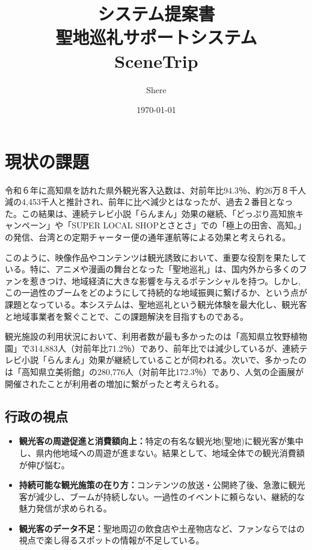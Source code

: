 \documentclass[a4j, 11pt, report]{jsarticle}
\title{
    {\Huge システム提案書} \\
    \vspace{6cm}
    {\Huge 聖地巡礼サポートシステム} \\
    \vspace{0.5cm}
    {\Huge \textbf{SceneTrip}}
}
\author{Shere}
\date{\today}
\begin{document}
\maketitle
\thispagestyle{empty}
\clearpage

\tableofcontents
\clearpage

\section{現状の課題}
令和６年に高知県を訪れた県外観光客入込数は、対前年比94.3％、約26万８千人減の4,453千人と推計され、前年に比べ減少とはなったが、過去２番目となった。この結果は、連続テレビ小説「らんまん」効果の継続、「どっぷり高知旅キャンペーン」や「SUPER LOCAL SHOPとさとさ」での「極上の田舎、高知。」の発信、台湾との定期チャーター便の通年運航等による効果と考えられる。

このように、映像作品やコンテンツは観光誘致において、重要な役割を果たしている。特に、アニメや漫画の舞台となった「聖地巡礼」は、国内外から多くのファンを惹きつけ、地域経済に大きな影響を与えるポテンシャルを持つ。しかし,この一過性のブームをどのようにして持続的な地域振興に繋げるか、という点が課題となっている。本システムは、聖地巡礼という観光体験を最大化し、観光客と地域事業者を繋ぐことで、この課題解決を目指すものである。

観光施設の利用状況において、利用者数が最も多かったのは「高知県立牧野植物園」で314,883人（対前年比71.2％）であり、前年比では減少しているが、連続テレビ小説「らんまん」効果が継続していることが伺われる。次いで、多かったのは「高知県立美術館」の280,776人（対前年比172.3％）であり、人気の企画展が開催されたことが利用者の増加に繋がったと考えられる。

\subsection{行政の視点}
\begin{itemize}
    \item \textbf{観光客の周遊促進と消費額向上：}特定の有名な観光地(聖地)に観光客が集中し、県内他地域への周遊が進まない。結果として、地域全体での観光消費額が伸び悩む。
    \item \textbf{持続可能な観光施策の在り方：}コンテンツの放送・公開終了後、急激に観光客が減少し、ブームが持続しない。一過性のイベントに頼らない、継続的な魅力発信が求められる。
    \item \textbf{観光客のデータ不足：}聖地周辺の飲食店や土産物店など、ファンならではの視点で楽し得るスポットの情報が不足している。
\end{itemize}
\end{document}
